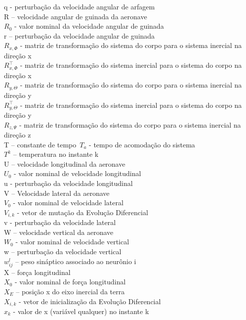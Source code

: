 \documentclass[10pt,a4paper]{article}
\numberwithin{equation}{section}
\begin{document}
q - perturbação da velocidade angular de arfagem\\
R – velocidade angular de guinada da aeronave\\
$R_0$ - valor nominal da velocidade angular de guinada\\
r – perturbação da velocidade angular de guinada\\
$R_{x,\Phi}$  - matriz de transformação do sistema do corpo para o sistema inercial na direção x\\
$R_{x,\Phi}^\top$  - matriz de transformação do sistema inercial para o sistema do corpo na direção x \\
$R_{y,\Theta}$  - matriz de transformação do sistema do corpo para o sistema inercial na direção y\\
$R_{y,\Theta}^\top$  - matriz de transformação do sistema inercial para o sistema do corpo na direção y\\
$R_{z,\Psi}$  - matriz de transformação do sistema do corpo para o sistema inercial na direção z\\
T – constante de tempo\
$T_a$ - tempo de acomodação do sistema\\
$T^k$ – temperatura no instante k\\
U – velocidade longitudinal da aeronave\\
$U_0$ - valor nominal de velocidade longitudinal\\
u - perturbação da velocidade longitudinal \\
V – Velocidade lateral da aeronave\\
$V_0$ - valor nominal de velocidade lateral\\
$V_{i,k}$ - vetor de mutação da Evolução Diferencial\\
v - perturbação da velocidade lateral\\
W – velocidade vertical  da aeronave\\
$W_0$ - valor nominal de velocidade vertical \\
w – perturbação da velocidade vertical\\
$w_{ij}^l$ – peso sináptico associado ao neurônio i\\
X – força longitudinal \\
$X_0$ - valor nominal de força longitudinal\\
$X_E$ – posição x do eixo inercial da terra\\
$X_{i,k}$ - vetor de inicialização da Evolução Diferencial\\
$x_k$ - valor de x (variável qualquer) no instante k\\
\end{document}
